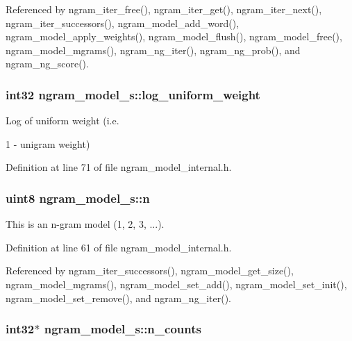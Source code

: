 Referenced by ngram\-\_\-iter\-\_\-free(), ngram\-\_\-iter\-\_\-get(), ngram\-\_\-iter\-\_\-next(), ngram\-\_\-iter\-\_\-successors(), ngram\-\_\-model\-\_\-add\-\_\-word(), ngram\-\_\-model\-\_\-apply\-\_\-weights(), ngram\-\_\-model\-\_\-flush(), ngram\-\_\-model\-\_\-free(), ngram\-\_\-model\-\_\-mgrams(), ngram\-\_\-ng\-\_\-iter(), ngram\-\_\-ng\-\_\-prob(), and ngram\-\_\-ng\-\_\-score().

\subsubsection[{log\-\_\-uniform\-\_\-weight}]{\setlength{\rightskip}{0pt plus 5cm}int32 ngram\-\_\-model\-\_\-s\-::log\-\_\-uniform\-\_\-weight}\label{structngram__model__s_aa38c5fdecaefd9a2f43b69f26ae492c1}


Log of uniform weight (i.\-e. 

1 -\/ unigram weight) 

Definition at line 71 of file ngram\-\_\-model\-\_\-internal.\-h.

\subsubsection[{n}]{\setlength{\rightskip}{0pt plus 5cm}uint8 ngram\-\_\-model\-\_\-s\-::n}\label{structngram__model__s_a3c87bc1b678662a2c8930b3b8c33a80f}


This is an n-\/gram model (1, 2, 3, ...). 



Definition at line 61 of file ngram\-\_\-model\-\_\-internal.\-h.



Referenced by ngram\-\_\-iter\-\_\-successors(), ngram\-\_\-model\-\_\-get\-\_\-size(), ngram\-\_\-model\-\_\-mgrams(), ngram\-\_\-model\-\_\-set\-\_\-add(), ngram\-\_\-model\-\_\-set\-\_\-init(), ngram\-\_\-model\-\_\-set\-\_\-remove(), and ngram\-\_\-ng\-\_\-iter().

\subsubsection[{n\-\_\-counts}]{\setlength{\rightskip}{0pt plus 5cm}int32$\ast$ ngram\-\_\-model\-\_\-s\-::n\-\_\-counts}\label{structngram__model__s_a9dcba9b49cc1cd189b257e5838da0eee}


